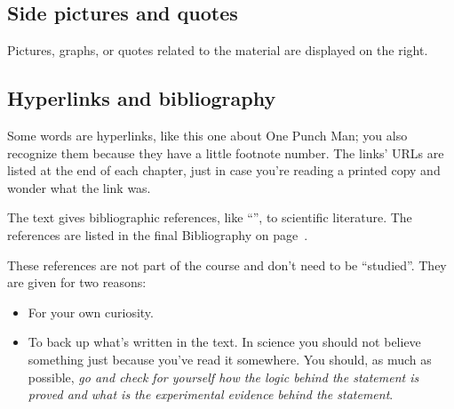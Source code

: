 \documentclass[a4paper,12pt,%
onecolumn,oneside,titlepage,%
british%
]{memoir}
\providecommand{\href}[2]{#2}
\renewcommand*{\|}[1][]{\nonscript\:#1\vert\nonscript\:\mathopen{}}
\newcommand*{\furl}[2]{\href{#1}{#2}\pagenote{\url{#1}}}
\begin{document}
\subsection{\enspace Side pictures and quotes}

%
Pictures, graphs, or quotes related to the material are displayed on the right.


\subsection{\enspace Hyperlinks and bibliography}

Some words are hyperlinks, like this one about \furl{https://onepunchman.fandom.com}{One Punch Man}; you also recognize them because they have a little footnote number. The links' URLs are listed at the end of each chapter, just in case you're reading a printed copy and wonder what the link was.

\medskip

The text gives bibliographic references, like \enquote{\cites{einstein1905c}}, to scientific literature. The references are listed in the final Bibliography on page~\pageref{sec:biblio}.

These references are not part of the course and don't need to be \enquote{studied}. They are given for two reasons:
\begin{itemize}
\item For your own curiosity.

\item
{}%
To back up what's written in the text.
In science you should not believe something just because you've read it somewhere. You should, as much as possible, \emph{go and check for yourself how the logic behind the statement is proved and what is the experimental evidence behind the statement}.
\end{itemize}
\end{document}

